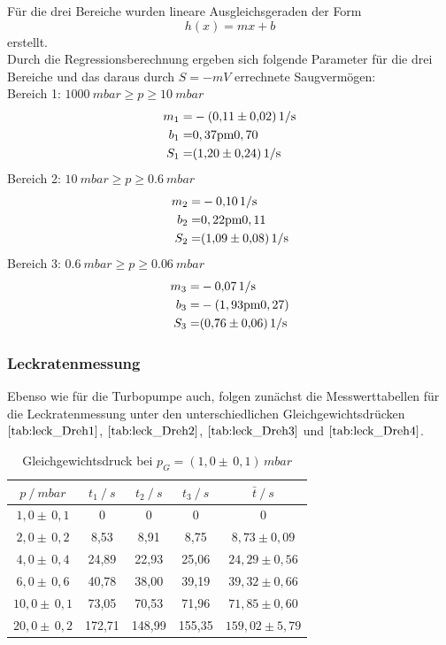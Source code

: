 Für die drei Bereiche wurden lineare Ausgleichsgeraden der Form
\begin{equation}
	h(x)=mx+b
\end{equation}
erstellt.\\
Durch die Regressionsberechnung ergeben sich folgende Parameter für die drei Bereiche und das daraus durch $S=-mV$ errechnete Saugvermögen:\\\vspace{1cm}
Bereich 1: $\SI{1000}{mbar} \geq p \geq \SI{10}{mbar}$\\
\begin{align*}
	m_1=& -\SI{0,11 \pm 0,02}{1/s}\\
	b_1=& \si{0,37 \pm 0,70}\\
	S_1=& \SI{1,20 \pm 0,24}{1/s}
\end{align*}
Bereich 2: $\SI{10}{mbar} \geq p \geq \SI{0,6}{mbar}$\\
\begin{align*}
	m_2=& -\SI{0,10 \pm 0,00}{1/s}\\
	b_2=& \si{0,22 \pm 0,11}\\
	S_2=& \SI{1,09 \pm 0,08}{1/s}
\end{align*}
Bereich 3: $\SI{0,6}{mbar} \geq p \geq \SI{0,06}{mbar}$\\
\begin{align*}
	m_3=& -\SI{0,07 \pm 0,00}{1/s}\\
	b_3=& -\si{(1,93 \pm 0,27)}\\
	S_3=& \SI{0,76 \pm 0,06}{1/s}
\end{align*}

\subsubsection{Leckratenmessung}
Ebenso wie für die Turbopumpe auch, folgen zunächst die Messwerttabellen für die Leckratenmessung
unter den unterschiedlichen Gleichgewichtsdrücken $\ref{tab:leck_Dreh1}$, $\ref{tab:leck_Dreh2}$, $\ref{tab:leck_Dreh3}$ und $\ref{tab:leck_Dreh4}$.
\begin{table}[H]
\centering
\label{tab:leck_Dreh1}
\begin{tabular}{c|c|c|c|c}
	{$p \:/\: \si{mbar}$} & {$t_1 \:/\: \si{s} $} & {$t_2 \:/\: \si{s} $} & {$t_3 \:/\: \si{s} $} & {$\bar{t} \:/\: \si{s}$}\\
\midrule
$1,0 \pm \, 0,1$ &0 &0 &0 &0\\
$2,0 \pm \, 0,2$ &   8,53 &  8,91 &  8,75 & $8,73 \pm 0,09$\\
$4,0 \pm \, 0,4$ &   24,89  &  22,93 &  25,06 & $24,29 \pm 0,56 $\\
$6,0 \pm \, 0,6$ &   40,78 &  38,00 &  39,19 & $39,32 \pm 0,66 $\\
$10,0 \pm \, 0,1$ &   73,05 &  70,53 &  71,96 & $71,85 \pm 0,60 $\\
$20,0 \pm \, 0,2$ &   172,71 &  148,99 &  155,35 & $159,02 \pm 5,79 $\\
\end{tabular}
\caption{Gleichgewichtsdruck bei $p_G=(1,0 \pm \, 0,1)  \, \si{mbar}$}
\end{table}

